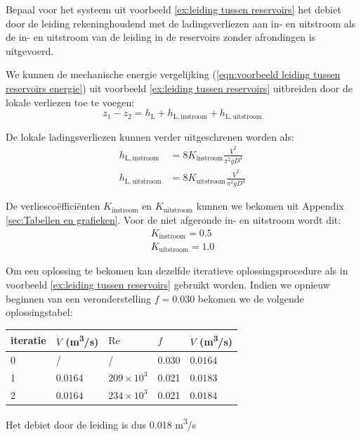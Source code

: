 \begin{voorbeeld}
\label{ex:voorbeeld leiding tussen reservoirs lokale verliezen}
Bepaal voor het systeem uit  voorbeeld \ref{ex:leiding tussen reservoirs} het debiet door de leiding rekeninghoudend met de ladingsverliezen aan in- en uitstroom als de in- en uitstroom van de leiding in de reservoirs zonder afrondingen is uitgevoerd.

We kunnen de mechanische energie vergelijking (\ref{eqn:voorbeeld leiding tussen reservoirs energie}) uit voorbeeld \ref{ex:leiding tussen reservoirs} uitbreiden door de lokale verliezen toe te voegen:
\begin{equation}
	z_1 -z_2 = h_\mathrm{L} + h_\mathrm{L,instroom} + h_\mathrm{L,uitstroom}
	\label{eqn:voorbeeld leiding tussen reservoirs lokale verliezen energie}
\end{equation}

De lokale ladingsverliezen kunnen verder uitgeschrenen worden als:
\begin{align}
	h_\mathrm{L,instroom} &= 8 K_\mathrm{instroom} \frac{\dot{V}^2}{\pi^2 g D^4} \nonumber \\
	h_\mathrm{L,uitstroom} &= 8 K_\mathrm{uitstroom} \frac{\dot{V}^2}{\pi^2 g D^4} \nonumber
\end{align}

De verliescoëfficiënten $K_\mathrm{instroom}$ en $K_\mathrm{uitstroom}$ kunnen we bekomen uit Appendix \ref{sec:Tabellen en grafieken}. Voor de niet afgeronde in- en uitstroom wordt dit:
\begin{align}
	K_\mathrm{instroom} = 0.5 \nonumber \\
	K_\mathrm{uitstroom} = 1.0 \nonumber
\end{align}

Om een oplossing te bekomen kan dezelfde iteratieve oplossingsprocedure als in voorbeeld \ref{ex:leiding tussen reservoirs} gebruikt worden. Indien we opnieuw beginnen van een veronderstelling $f=0.030$ bekomen we de volgende oplossingstabel:
\begin{center}
	\begin{tabular}{lllll}
		\hline
		iteratie & $\dot{V}$ (\unit{m^3/s}) & $\mathrm{Re}$   & $f$   & $\dot{V}$ (\unit{m^3/s}) \\
		\hline
		0        &    /                     &       /         & 0.030 &  $0.0164$ \\
		1        & $0.0164$                 & $209\times10^3$ & 0.021 &  $0.0183$ \\
		2        & $0.0164$                 &   $234\times10^3$ & 0.021 &  $0.0184$ \\
		\hline
	\end{tabular}
\end{center}

Het debiet door de leiding is dus 0.018 \unit{m^3/s}

\end{voorbeeld}

